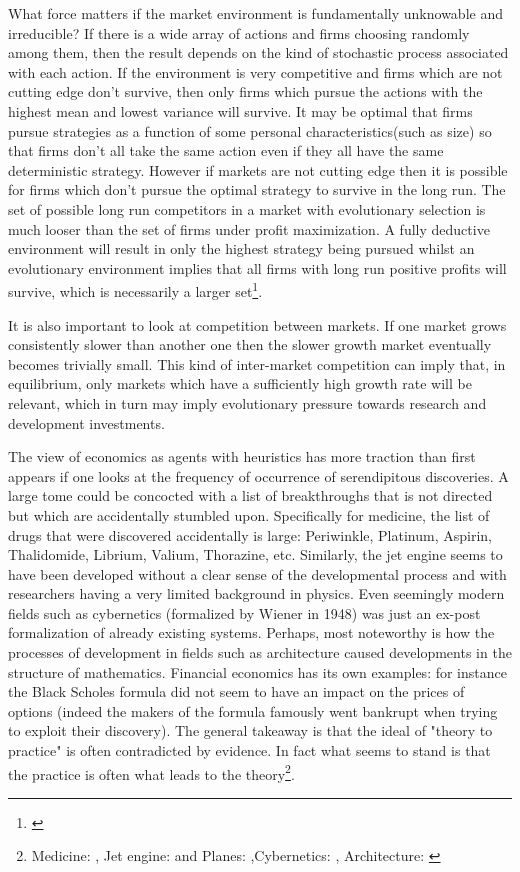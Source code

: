 What force matters if the market environment is fundamentally unknowable and irreducible? If there is a wide array of actions and firms choosing randomly among them, then the result depends on the kind of stochastic process associated with each action. If the environment is very competitive and firms which are not cutting edge don't survive, then only firms which pursue the actions with the highest mean and lowest variance will survive. It may be optimal that firms pursue strategies as a function of some personal characteristics(such as size) so that firms don't all take the same action even if they all have the same deterministic strategy. However if markets are not cutting edge then it is possible for firms which don't pursue the optimal strategy to survive in the long run. The set of possible long run competitors in a market with evolutionary selection is much looser than the set of firms under profit maximization. A fully deductive environment will result in only the highest strategy being pursued whilst an evolutionary environment implies that all firms with long run positive profits will survive, which is necessarily a larger set\footnote{\citep{alchian1950uncertainty}}. 

It is also important to look at competition between markets. If one market grows consistently slower than another one then the slower growth market eventually becomes trivially small. This kind of inter-market competition can imply that, in equilibrium, only markets which have a sufficiently high growth rate will be relevant, which in turn may imply evolutionary pressure towards research and development investments. 

The view of economics as agents with heuristics has more traction than first appears if one looks at the frequency of occurrence of serendipitous discoveries. A large tome could be concocted with a list of breakthroughs that is not directed but which are accidentally stumbled upon. Specifically for medicine, the list of drugs that were discovered accidentally is large: Periwinkle, Platinum, Aspirin, Thalidomide, Librium, Valium, Thorazine, etc. Similarly, the jet engine seems to have been developed without a clear sense of the developmental process and with researchers having a very limited background in physics. Even seemingly modern fields such as cybernetics (formalized by Wiener in 1948) was just an ex-post formalization of already existing systems. Perhaps, most noteworthy is how the processes of development in fields such as architecture caused developments in the structure of mathematics. Financial economics has its own examples: for instance the Black Scholes formula did not seem to have an impact on the prices of options (indeed the makers of the formula famously went bankrupt when trying to exploit their discovery). The general takeaway is that the ideal of "theory to practice" is often contradicted by evidence. In fact what seems to stand is that the practice is often what leads to the theory\footnote{ Medicine: \cite{meyers2007happy}, Jet engine: \cite{scranton2006urgency} and Planes: \cite{meyer2013airplane},Cybernetics: \cite{mindell2002between}, Architecture: \cite{unguru1992guy}}.

